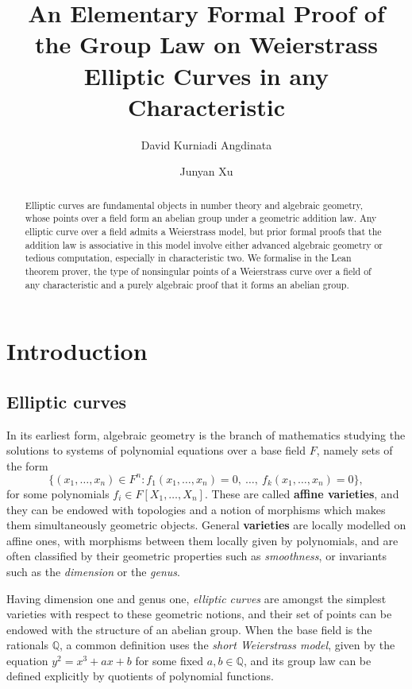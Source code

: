 \documentclass[a4paper,UKenglish,cleveref,autoref,thm-restate]{lipics-v2021}
\title{An Elementary Formal Proof of the Group Law on Weierstrass Elliptic Curves in any Characteristic}
\author{David Kurniadi Angdinata}{London School of Geometry and Number Theory, United Kingdom \and \url{https://multramate.github.io}}{ucahdka@ucl.ac.uk}{https://orcid.org/0000-0003-2096-1864}{}
\author{Junyan Xu}{Cancer Data Science Laboratory, National Cancer Institute, United States}{junyanxu.math@gmail.com}{https://orcid.org/0000-0002-3789-2319}{}
\begin{document}
\maketitle

\begin{abstract}
Elliptic curves are fundamental objects in number theory and algebraic geometry, whose points over a field form an abelian group under a geometric addition law. Any elliptic curve over a field admits a Weierstrass model, but prior formal proofs that the addition law is associative in this model involve either advanced algebraic geometry or tedious computation, especially in characteristic two. We formalise in the Lean theorem prover, the type of nonsingular points of a Weierstrass curve over a field of any characteristic and a purely algebraic proof that it forms an abelian group.
\end{abstract}

\section{Introduction}

\subsection{Elliptic curves}

In its earliest form, algebraic geometry is the branch of mathematics studying the solutions to systems of polynomial equations over a base field $ F $, namely sets of the form
\[ \{(x_1, \dots, x_n) \in F^n : f_1(x_1, \dots, x_n) = 0, \ \dots, \ f_k(x_1, \dots, x_n) = 0\}, \]
for some polynomials $ f_i \in F[X_1, \dots, X_n] $. These are called \textbf{affine varieties}, and they can be endowed with topologies and a notion of morphisms which makes them simultaneously geometric objects. General \textbf{varieties} are locally modelled on affine ones, with morphisms between them locally given by polynomials, and are often classified by their geometric properties such as \emph{smoothness}, or invariants such as the \emph{dimension} or the \emph{genus}.

Having dimension one and genus one, \emph{elliptic curves} are amongst the simplest varieties with respect to these geometric notions, and their set of points can be endowed with the structure of an abelian group. When the base field is the rationals $ \mathbb{Q} $, a common definition uses the \emph{short Weierstrass model}, given by the equation $ y^2 = x^3 + ax + b $ for some fixed $ a, b \in \mathbb{Q} $, and its group law can be defined explicitly by quotients of polynomial functions.
\end{document}
